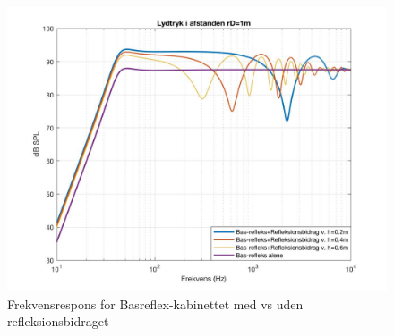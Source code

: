 \begin{figure}[h!]
	\centering
	\includegraphics[width=\textwidth]{Pics/sim_samletrespons2}
	\caption{Frekvensrespons for Basreflex-kabinettet med vs uden refleksionsbidraget} 
	\label{fig:sim_samletrespons}
\end{figure}
